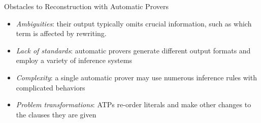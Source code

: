 \documentclass[10pt, xetex, hyperref={pdfpagelabels=false}]{beamer}
\begin{document}
\begin{frame}{Obstacles to Reconstruction with Automatic Provers \citep{Paulson2007}}
\begin{itemize}
\item \textit{Ambiguities}: their output typically omits crucial information,
such as which term is affected by rewriting.
\item \textit{Lack of standards}: automatic provers generate different output formats
and employ a variety of inference systems
\item \textit{Complexity}: a single automatic prover may use numerous inference rules with
complicated behaviors
\item \textit{Problem transformations}: ATPs re-order literals and make other changes to the clauses
they are given
\end{itemize}

\end{frame}
\end{document}
